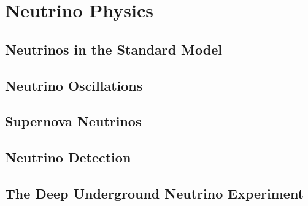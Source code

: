 % 

\chapter{\label{ch:2-neutrinophysics}Neutrino Physics} 

\minitoc

\section{Neutrinos in the Standard Model}

\section{Neutrino Oscillations}

\section{Supernova Neutrinos}

\section{Neutrino Detection}

\section{The Deep Underground Neutrino Experiment}

